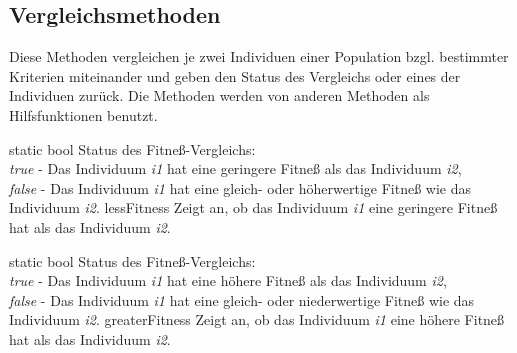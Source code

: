 \documentclass{report}
\begin{document}
\newpage

\subsection{Vergleichsmethoden}
Diese Methoden vergleichen je zwei Individuen einer Population bzgl.
bestimmter Kriterien miteinander und geben den Status des Vergleichs
oder eines der Individuen zur\"uck. Die Methoden werden von anderen
Methoden als Hilfsfunktionen benutzt.

\vspace{2ex}

\setNormalInstance
\setCorrectWidthThree{8pt}
\printMethodWithParamsSaved
{static bool}
{Status des Fitne{\ss}-Vergleichs:\\
 {\em true} - Das Individuum {\em i1} hat eine geringere Fitne{\ss} als 
 das Individuum {\em i2},\\
 {\em false} - Das Individuum {\em i1} hat eine gleich- oder h\"oherwertige 
 Fitne{\ss} wie das Individuum {\em i2}.}
{lessFitness}
{Zeigt an, ob das Individuum {\em i1} eine geringere Fitne{\ss} hat als das
    Individuum {\em i2}.}
{}
\setCorrectWidthThree{4pt}

\vspace{4ex}

\setNormalInstance
\setCorrectWidthThree{8pt}
\printMethodWithParamsSaved
{static bool}
{Status des Fitne{\ss}-Vergleichs:\\
 {\em true} - Das Individuum {\em i1} hat eine h\"ohere Fitne{\ss} als 
 das Individuum {\em i2},\\
 {\em false} - Das Individuum {\em i1} hat eine gleich- oder niederwertige 
 Fitne{\ss} wie das Individuum {\em i2}.}
{greaterFitness}
{Zeigt an, ob das Individuum {\em i1} eine h\"ohere Fitne{\ss} hat als das
    Individuum {\em i2}.}
{}
\setCorrectWidthThree{4pt}

\newpage
\end{document}
